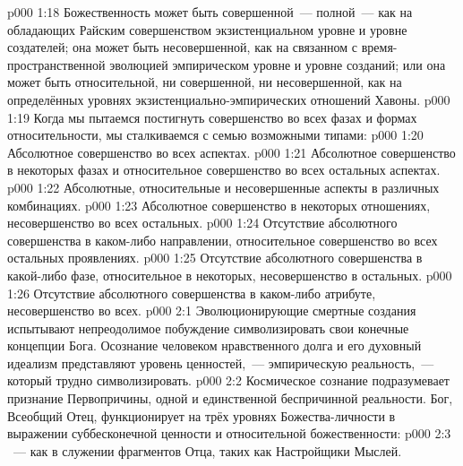 \vs p000 1:18 Божественность может быть совершенной~--- полной~--- как на обладающих Райским совершенством экзистенциальном уровне и уровне создателей; она может быть несовершенной, как на связанном с время\hyp{}пространственной эволюцией эмпирическом уровне и уровне созданий; или она может быть относительной, ни совершенной, ни несовершенной, как на определённых уровнях экзистенциально\hyp{}эмпирических отношений Хавоны.
\vs p000 1:19 \pc Когда мы пытаемся постигнуть совершенство во всех фазах и формах относительности, мы сталкиваемся с семью возможными типами:
\vs p000 1:20 Абсолютное совершенство во всех аспектах.
\vs p000 1:21 Абсолютное совершенство в некоторых фазах и относительное совершенство во всех остальных аспектах.
\vs p000 1:22 Абсолютные, относительные и несовершенные аспекты в различных комбинациях.
\vs p000 1:23 Абсолютное совершенство в некоторых отношениях, несовершенство во всех остальных.
\vs p000 1:24 Отсутствие абсолютного совершенства в каком\hyp{}либо направлении, относительное совершенство во всех остальных проявлениях.
\vs p000 1:25 Отсутствие абсолютного совершенства в какой\hyp{}либо фазе, относительное в некоторых, несовершенство в остальных.
\vs p000 1:26 Отсутствие абсолютного совершенства в каком\hyp{}либо атрибуте, несовершенство во всех.
\vs p000 2:1 Эволюционирующие смертные создания испытывают непреодолимое побуждение символизировать свои конечные концепции Бога. Осознание человеком нравственного долга и его духовный идеализм представляют уровень ценностей,~--- эмпирическую реальность,~--- который трудно символизировать.
\vs p000 2:2 Космическое сознание подразумевает признание Первопричины, одной и единственной беспричинной реальности. Бог, Всеобщий Отец, функционирует на трёх уровнях Божества\hyp{}личности в выражении суббесконечной ценности и относительной божественности:
\vs p000 2:3 ~--- как в служении фрагментов Отца, таких как Настройщики Мыслей.
